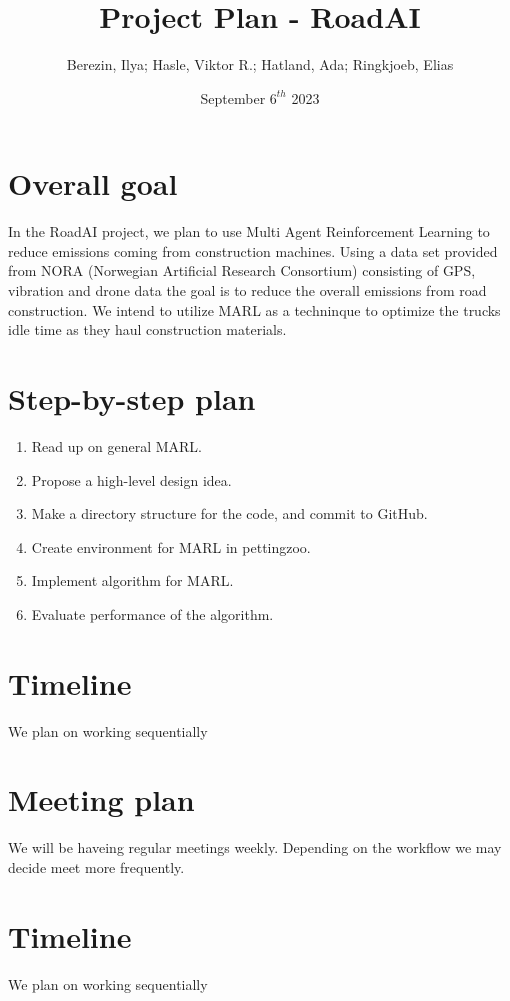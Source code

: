 \documentclass{article}
\title{Project Plan - RoadAI}
\author{Berezin, Ilya; Hasle, Viktor R.; Hatland, Ada; Ringkjoeb, Elias}
\date{September $6^{th}$ 2023}
\begin{document}
\begin{titlepage}
\maketitle
\tableofcontents
\end{titlepage}


\section{Overall goal}
In the RoadAI project, we plan to use Multi Agent Reinforcement Learning to reduce emissions coming from
construction machines. Using a data set provided from NORA (Norwegian Artificial Research Consortium) consisting of GPS, vibration and drone data
the goal is to reduce the overall emissions from road construction. We intend to utilize MARL as a techninque to optimize
the trucks idle time as they haul construction materials.

\section{Step-by-step plan}
\begin{enumerate}
  \item Read up on general MARL.\\
  \item Propose a high-level design idea.\\
  \item Make a directory structure for the code, and commit to GitHub.\\
  \item Create environment for MARL in pettingzoo.\\
  \item Implement algorithm for MARL. \\
  \item Evaluate performance of the algorithm.
\end{enumerate}

\section{Timeline}
We plan on working sequentially
\section{Meeting plan}
We will be haveing regular meetings weekly. Depending on the workflow we may decide meet more frequently.
\section{Timeline}
We plan on working sequentially
\end{document}
